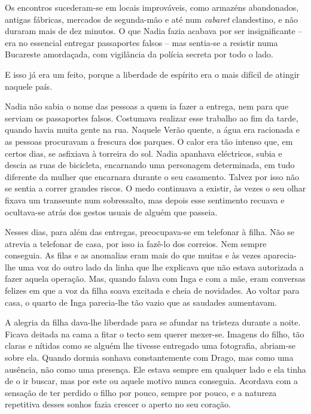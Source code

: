 Os encontros sucederam-se em locais improváveis,
como armazéns abandonados, antigas fábricas, mercados de segunda-mão e
até num \emph{cabaret }clandestino, e não duraram mais de dez minutos. O
que Nadia fazia acabava por ser insignificante -- era no essencial
entregar passaportes falsos -- mas sentia-se a resistir numa Bucareste
amordaçada, com vigilância da polícia secreta por todo o lado.

E isso já era um feito, porque a liberdade de espírito era o mais
difícil de atingir naquele país.

Nadia não sabia o nome das pessoas a quem ia fazer a entrega, nem para
que serviam os passaportes falsos. Costumava realizar esse trabalho ao
fim da tarde, quando havia muita gente na rua. Naquele Verão quente, a
água era racionada e as pessoas procuravam a frescura dos parques. O
calor era tão intenso que, em certos dias, se asfixiava à torreira do
sol. Nadia apanhava eléctricos, subia e descia as ruas de bicicleta,
encarnando uma personagem determinada, em tudo diferente da mulher que
encarnara durante o seu casamento. Talvez por isso não se sentia a
correr grandes riscos. O medo continuava a existir, às vezes o seu olhar
fixava um transeunte num sobressalto, mas depois esse sentimento recuava
e ocultava-se atrás dos gestos usuais de alguém que passeia.

Nesses dias, para além das entregas, preocupava-se em
telefonar à filha. Não se atrevia a telefonar de casa, por isso ia
fazê-lo dos correios. Nem sempre conseguia. As filas e as anomalias eram
mais do que muitas e às vezes aparecia-lhe uma voz do outro lado da
linha que lhe explicava que não estava autorizada a fazer aquela
operação. Mas, quando falava com Inga e com a mãe, eram conversas
felizes em que a voz da filha soava excitada e cheia de novidades. Ao
voltar para casa, o quarto de Inga parecia-lhe tão vazio que as saudades aumentavam.

A alegria da filha dava-lhe liberdade para se afundar na tristeza
durante a noite. Ficava deitada na cama a fitar o tecto sem querer
mexer-se. Imagens do filho, tão claras e nítidas como se alguém lhe
tivesse entregado uma fotografia, abriam-se sobre ela. Quando dormia sonhava constantemente com
Drago, mas como uma ausência, não como uma presença. Ele estava sempre
em qualquer lado e ela tinha de o ir buscar, mas por este ou aquele
motivo nunca conseguia. Acordava com a sensação de ter perdido o filho
por pouco, sempre por pouco, e a natureza repetitiva desses sonhos
fazia crescer o aperto no seu coração.


